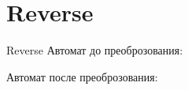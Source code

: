 \section{Reverse}
\begin{frame}{Reverse}
	Автомат до преоброзования:


	Автомат после преоброзования:

\end{frame}

